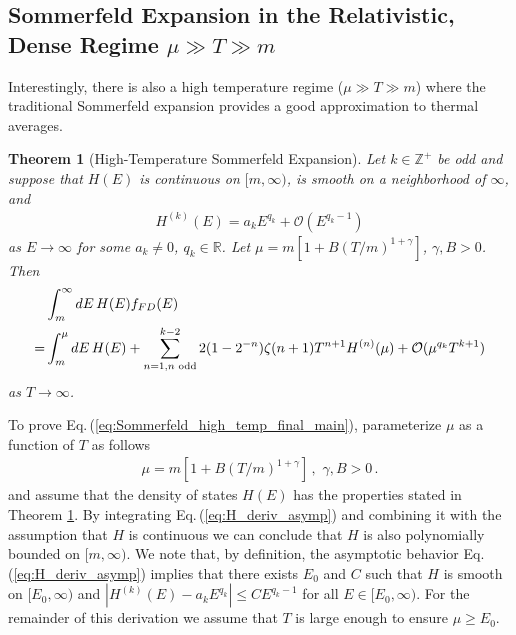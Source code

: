 \documentclass[sn-mathphys,Numbered]{sn-jnl}
\newcommand{\req}[1]{Eq.\,(\ref{#1})}
\newtheorem{theorem}{Theorem}
\begin{document}
 \subsection{ Sommerfeld Expansion in the Relativistic, Dense Regime $\mu\gg T\gg m$}\label{Section:HighTempSommerfeld} 
Interestingly, there is also a high temperature regime ($\mu\gg T\gg m$) where the traditional Sommerfeld expansion provides a good approximation to thermal averages. 
\begin{theorem}[High-Temperature Sommerfeld Expansion]\label{thm:high_T_Sommerfeld_main}
Let $k\in\mathbb{Z}^+$ be odd and suppose that $H(E)$ is continuous on $[m,\infty)$, is smooth on a neighborhood of $\infty$, and
\begin{align}\label{eq:H_deriv_asymp}
 H^{(k)}(E)=a_kE^{q_k}+\mathcal{O}(E^{q_k-1}) 
\end{align}
as $E\to \infty$ for some $a_k\neq 0$, $q_k\in\mathbb{R}$. Let $\mu=m[1+B(T/m)^{1+\gamma}]$, $\gamma,B>0$. Then
\begin{align}
 &\int_m^\infty dE\, H(E)f_{FD}(E)\notag\\
=&\int_m^\mu dE\, H(E)+\sum_{n=1,n\text{ odd}}^{k-2} 2(1-2^{-n})\zeta(n+1)T^{n+1}H^{(n)}(\mu)+\mathcal{O}(\mu^{q_k}T^{k+1})\label{eq:Sommerfeld_high_temp_final_main}
\end{align}
as $T\to\infty$.
\end{theorem}



To prove \req{eq:Sommerfeld_high_temp_final_main}, parameterize $\mu$ as a function of $T$ as follows
\begin{align}\label{eq:mu_infinity_faster}
\mu=m[1+B(T/m)^{1+\gamma}] \,,\,\,\gamma,B>0\,. 
\end{align}
and assume that the density of states $H(E)$ has the properties stated in Theorem \ref{thm:high_T_Sommerfeld_main}.
By integrating \req{eq:H_deriv_asymp} and combining it with the assumption that $H$ is continuous we can conclude that $H$ is also polynomially bounded on $[m,\infty)$. We note that, by definition, the asymptotic behavior \req{eq:H_deriv_asymp} implies that there exists $E_0$ and $C$ such that $H$ is smooth on $[E_0,\infty)$ and $|H^{(k)}(E)-a_kE^{q_k}|\leq CE^{q_k-1}$ for all $E\in[E_0,\infty)$. For the remainder of this derivation we assume that $T$ is large enough to ensure $\mu\geq E_0$. 
\end{document}

